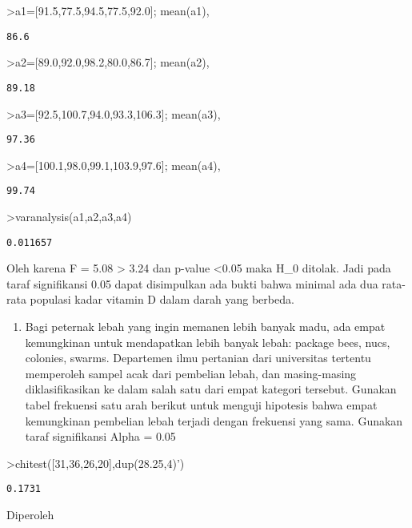 \documentclass[
]{book}
\providecommand{\tightlist}{%
  \setlength{\itemsep}{0pt}\setlength{\parskip}{0pt}}
\begin{document}
\textgreater a1={[}91.5,77.5,94.5,77.5,92.0{]}; mean(a1),

\begin{verbatim}
86.6
\end{verbatim}

\textgreater a2={[}89.0,92.0,98.2,80.0,86.7{]}; mean(a2),

\begin{verbatim}
89.18
\end{verbatim}

\textgreater a3={[}92.5,100.7,94.0,93.3,106.3{]}; mean(a3),

\begin{verbatim}
97.36
\end{verbatim}

\textgreater a4={[}100.1,98.0,99.1,103.9,97.6{]}; mean(a4),

\begin{verbatim}
99.74
\end{verbatim}

\textgreater varanalysis(a1,a2,a3,a4)

\begin{verbatim}
0.011657
\end{verbatim}

Oleh karena F = 5.08 \textgreater{} 3.24 dan p-value \textless0.05 maka H\_0 ditolak. Jadi pada taraf signifikansi 0.05 dapat disimpulkan ada bukti bahwa minimal ada dua rata-rata populasi kadar vitamin D dalam darah yang berbeda.

\begin{enumerate}
\def\labelenumi{\arabic{enumi}.}
\setcounter{enumi}{2}
\tightlist
\item
  Bagi peternak lebah yang ingin memanen lebih banyak madu, ada empat kemungkinan untuk mendapatkan lebih banyak lebah: package bees, nucs, colonies, swarms. Departemen ilmu pertanian dari universitas tertentu memperoleh sampel acak dari pembelian lebah, dan masing-masing diklasifikasikan ke dalam salah satu dari empat kategori tersebut. Gunakan tabel frekuensi satu arah berikut untuk menguji hipotesis bahwa empat kemungkinan pembelian lebah terjadi dengan frekuensi yang sama. Gunakan taraf signifikansi Alpha = 0.05
\end{enumerate}

\textgreater chitest({[}31,36,26,20{]},dup(28.25,4)')

\begin{verbatim}
0.1731
\end{verbatim}

Diperoleh
\end{document}
